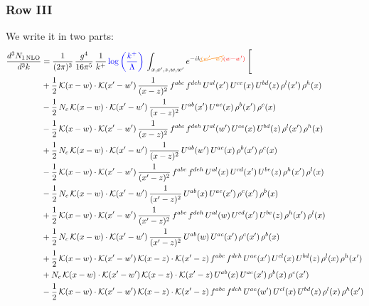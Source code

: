 \documentclass[9pt]{article}
\numberwithin{equation}{section}
\begin{document}
\subsubsection{Row III}
We write it in two parts: 
\begin{align}
\frac{d^{3}N_{1\,\mathrm{NLO}}}{d^{3}k} & = \frac{1}{(2\pi)^{3}}\,\frac{g^{4}}{16\pi^{5}}\,\frac{1}{k^{+}}\,{\color{blue}\log{\left(\frac{k^{+}}{\Lambda}\right)}}\,\int_{x,x',z,w,w'}e^{-ik{\color{orange}\cancel{(w'-w)}}{\color{red}(w-w')}}\,\Bigg[\notag\\ &  +\frac{1}{2}\,\mathcal{K}(x-w)\cdot\mathcal{K}(x'-w')\,\frac{1}{(x-z)^{2}}\,f^{abc}\,f^{deh}\,U^{al}(x')\,U^{ce}(x)\,U^{bd}(z)\,\rho^{l}(x')\,\rho^{h}(x)\notag\\
& -\frac{1}{2}\,N_{c}\,\mathcal{K}(x-w)\cdot\mathcal{K}(x'-w')\,\frac{1}{(x-z)^{2}}\,U^{ab}(x')\,U^{ac}(x)\,\rho^{b}(x')\,\rho^{c}(x)\notag\\
& -\frac{1}{2}\,\mathcal{K}(x-w)\cdot\mathcal{K}(x'-w')\,\frac{1}{(x-z)^{2}}\,f^{abc}\,f^{deh}\,U^{al}(w')\,U^{ce}(x)\,U^{bd}(z)\,\rho^{l}(x')\,\rho^{h}(x)\notag\\
& +\frac{1}{2}\,N_{c}\,\mathcal{K}(x-w)\cdot\mathcal{K}(x'-w')\,\frac{1}{(x-z)^{2}}\,U^{ab}(w')\,U^{ac}(x)\,\rho^{b}(x')\,\rho^{c}(x)\notag\\
& -\frac{1}{2}\,\mathcal{K}(x-w)\cdot\mathcal{K}(x'-w')\,\frac{1}{(x'-z)^{2}}\,f^{abc}\,f^{deh}\,U^{al}(x)\,U^{cd}(x')\,U^{be}(z)\,\rho^{h}(x')\,\rho^{l}(x)\notag\\
& -\frac{1}{2}\,N_{c}\,\mathcal{K}(x-w)\cdot\mathcal{K}(x'-w')\,\frac{1}{(x'-z)^{2}}\,U^{ab}(x)\,U^{ac}(x')\,\rho^{c}(x')\,\rho^{b}(x)\notag\\
& +\frac{1}{2}\,\mathcal{K}(x-w)\cdot\mathcal{K}(x'-w')\,\frac{1}{(x'-z)^{2}}\,f^{abc}\,f^{deh}\,U^{al}(w)\,U^{cd}(x')\,U^{be}(z)\,\rho^{h}(x')\,\rho^{l}(x)\notag\\
& +\frac{1}{2}\,N_{c}\,\mathcal{K}(x-w)\cdot\mathcal{K}(x'-w')\,\frac{1}{(x'-z)^{2}}\,U^{ab}(w)\,U^{ac}(x')\,\rho^{c}(x')\,\rho^{b}(x)\notag\\
& +\frac{1}{2}\,\mathcal{K}(x-w)\cdot\mathcal{K}(x'-w')\,\mathcal{K}(x-z)\cdot\mathcal{K}(x'-z)\,f^{abc}\,f^{deh}\,U^{ae}(x')\,U^{cl}(x)\,U^{bd}(z)\,\rho^{l}(x)\,\rho^{h}(x')\notag\\
& +N_{c}\,\mathcal{K}(x-w)\cdot\mathcal{K}(x'-w')\,\mathcal{K}(x-z)\cdot\mathcal{K}(x'-z)\,U^{ab}(x)\,U^{ac}(x')\,\rho^{b}(x)\,\rho^{c}(x')\notag\\
& -\frac{1}{2}\,\mathcal{K}(x-w)\cdot\mathcal{K}(x'-w')\,\mathcal{K}(x-z)\cdot\mathcal{K}(x'-z)\,f^{abc}\,f^{deh}\,U^{ae}(w')\,U^{cl}(x)\,U^{bd}(z)\,\rho^{l}(x)\,\rho^{h}(x')\notag\\

\end{align}
\end{document}
